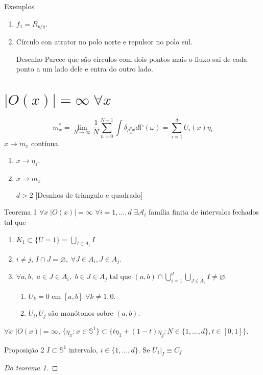 \begin{idea4}{Exemplos}\leavevmode
	\begin{enumerate}
		\item $f_1=R_{p/q}$.
		\item Círculo con atrator no polo norte e repulsor no polo sul.
		\item [Desenho] Parece que são círculos com dois pontos mais o fluxo sai de cada ponto a um lado dele e entra do outro lado.
	\end{enumerate}
\end{idea4} 

\section{$|O(x)|= \infty\;\forall x$}

\[m^* _x=\lim_{N\to \infty}\frac{1}{N}\sum_{n=0}^{N-1}\int \delta_{\rho^\eta_\omega x}d\mathbb{P}(\omega)=\sum_{i=1}^d U_i(x)\eta_i\]
$x\longrightarrow m_x$ contínua.

\begin{enumerate}[label=\textbf{$d=$\arabic*}]
	\item $x\longrightarrow \eta_1$.
	\item $x\longrightarrow m_x$ 
	\item[$d>2$] [Desnhos de triangulo e quadrado]
\end{enumerate}

\begin{idea1}{Teorema 1}\leavevmode
	$\forall x\; |O(x)|= \infty$ $\forall i=1,\ldots,d$ $ \exists \mathcal{A}_{i}$ família finita de intervalos fechados tal que
	\begin{enumerate}
		\item $K_1\subset \{U=1\} =\bigcup_{I\in A_i}I $
	
		\item $i\neq j$, $I\cap J=\varnothing,\;\forall J\in A_i,J\in A_j$.
		\item $\forall a,b,$ $a\in J\in A_i,$ $b \in J\in A_j$ tal que $(a,b)\cap \bigcup_{i=1} ^d\bigcup_{J\in A_i} I\neq \varnothing$.
			\begin{enumerate}[label=(\roman*)]
				\item $U_k=0$ em $[a,b]$  $\forall k\neq 1,0$.
				\item $U_i,U_j$ são monótonos sobre $(a,b)$. 
			\end{enumerate}
	\end{enumerate}
\end{idea1}

\begin{coro}
	$\forall x$ $|O(x)| =\infty$, $\{\eta_x:x\in\mathbb{S}^1\} \subset \{t\eta_1+(1-t)\eta_j:N\in\{1,\ldots,d\}, t\in [0,1]\}$.
\end{coro}

\begin{idea7}{Proposição 2}\leavevmode
	$I\subset \mathbb{S}^1$ intervalo, $i\in\{1,\ldots,d\}$. Se $U_1|_{I}\equiv C_f$
\end{idea7}

\begin{proof}[Do teorema 1]
	
\end{proof}


